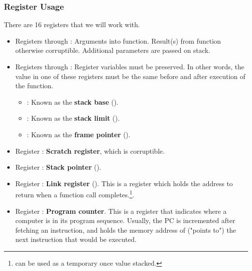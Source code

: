 \documentclass[letterpaper]{article}
\begin{document}
\subsubsection{Register Usage}
There are 16 registers that we will work with. 
\begin{itemize}
    \item Registers  through : Arguments into function. Result(s) from function otherwise corruptible. Additional parameters are passed on stack.
    \item Registers  through : Register variables must be preserved. In other words, the value in one of these registers must be the same before and after execution of the function. 
    \begin{itemize}
        \item {}: Known as the \textbf{stack base} ().
        \item {}: Known as the \textbf{stack limit} ().
        \item {}: Known as the \textbf{frame pointer} ().
    \end{itemize}
    \item Register : \textbf{Scratch register}, which is corruptible.
    \item Register : \textbf{Stack pointer} ().
    \item Register : \textbf{Link register} (). This is a register which holds the address to return when a function call completes.\footnote{ can be used as a temporary once value stacked.}. 
    \item Register : \textbf{Program counter}. This is a register that indicates where a computer is in its program sequence. Usually, the PC is incremented after fetching an instruction, and holds the memory address of ("points to") the next instruction that would be executed.
\end{itemize}
\end{document}
